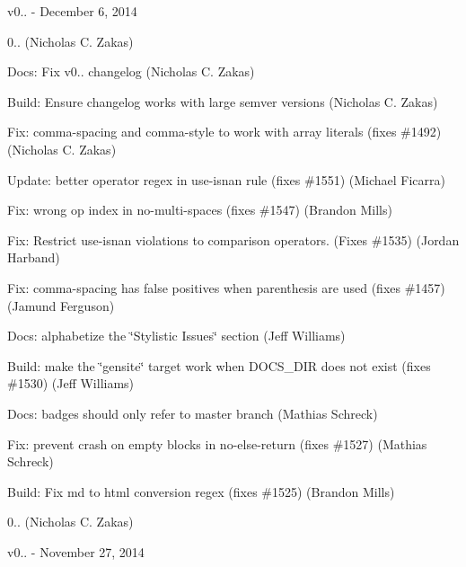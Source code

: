 v0.. -\/ December 6, 2014


\begin{DoxyItemize}
\item 0.. (Nicholas C. Zakas)
\item Docs\+: Fix v0.. changelog (Nicholas C. Zakas)
\item Build\+: Ensure changelog works with large semver versions (Nicholas C. Zakas)
\item Fix\+: comma-\/spacing and comma-\/style to work with array literals (fixes \#1492) (Nicholas C. Zakas)
\item Update\+: better operator regex in use-\/isnan rule (fixes \#1551) (Michael Ficarra)
\item Fix\+: wrong op index in no-\/multi-\/spaces (fixes \#1547) (Brandon Mills)
\item Fix\+: Restrict use-\/isnan violations to comparison operators. (Fixes \#1535) (Jordan Harband)
\item Fix\+: comma-\/spacing has false positives when parenthesis are used (fixes \#1457) (Jamund Ferguson)
\item Docs\+: alphabetize the \char`\"{}\+Stylistic Issues\char`\"{} section (Jeff Williams)
\item Build\+: make the \char`\"{}gensite\char`\"{} target work when D\+O\+C\+S\+\_\+\+D\+IR does not exist (fixes \#1530) (Jeff Williams)
\item Docs\+: badges should only refer to master branch (Mathias Schreck)
\item Fix\+: prevent crash on empty blocks in no-\/else-\/return (fixes \#1527) (Mathias Schreck)
\item Build\+: Fix md to html conversion regex (fixes \#1525) (Brandon Mills)
\item 0.. (Nicholas C. Zakas)
\end{DoxyItemize}

v0.. -\/ November 27, 2014


